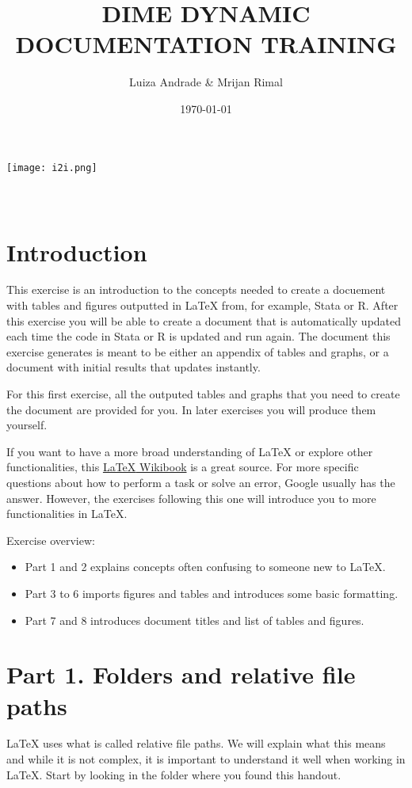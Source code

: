 \documentclass[12pts]{report}
\title{DIME DYNAMIC DOCUMENTATION TRAINING }
\author{Luiza Andrade \& Mrijan Rimal}
\date{\today}
\begin{document}
	

\makeatletter
\begin{titlepage}
	\begin{center}
		\texttt{[image: i2i.png]}\\[10ex]
		{\LARGE \bfseries  \@title }\\[2ex] 
		{\Large  \@author}\\[20ex] 
		{\large \@date}
	\end{center}
\end{titlepage}
\makeatother

\section*{Introduction}
This exercise is an introduction to the concepts needed to create a docuement with tables and figures outputted in {\LaTeX} from, for example, Stata or R. After this exercise you will be able to create a document that is automatically updated each time the code in Stata or R is updated and run again. The document this exercise generates is meant to be either an appendix of tables and graphs, or a document with initial results that updates instantly.

For this first exercise, all the outputed tables and graphs that you need to create the document are provided for you. In later exercises you will produce them yourself.

If you want to have a more broad understanding of {\LaTeX} or explore other functionalities, this \href{https://en.wikibooks.org/wiki/LaTeX
}{{\LaTeX} Wikibook} is a great source. For more specific questions about how to perform a task or solve an error, Google usually has the answer. However, the exercises following this one will introduce you to more functionalities in {\LaTeX}.

Exercise overview:
\begin{itemize}
	\item Part 1 and 2 explains concepts often confusing to someone new to {\LaTeX}.
	\item Part 3 to 6 imports figures and tables and introduces some basic formatting.
	\item Part 7 and 8 introduces document titles and list of tables and figures.
\end{itemize}

\section*{Part 1. Folders and relative file paths}
{\LaTeX} uses what is called relative file paths. We will explain what this means and while it is not complex, it is important to understand it well when working in {\LaTeX}. Start by looking in the folder where you found this handout. 
\end{document}
